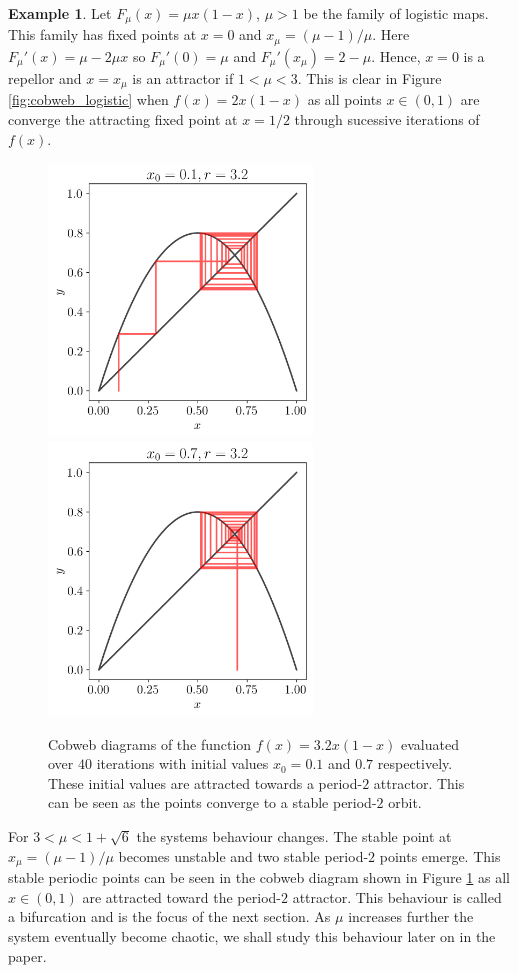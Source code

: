 \documentclass[11pt,a4paper,oneside]{memoir}
\theoremstyle{plain}
\theoremstyle{definition}
\newtheorem{exmp}[thm]{Example}
\begin{document}
\begin{exmp}
    Let $F_{\mu} (x) = \mu x(1 - x)$, $\mu > 1$ be the family of logistic maps. This family has fixed points at $x = 0$ and $x_\mu = (\mu - 1) / \mu$. Here $F_\mu'(x) = \mu - 2\mu x$ so $F_\mu'(0) = \mu$ and $F_\mu'(x_\mu) = 2 - \mu$. Hence, $x = 0$ is a repellor and $x = x_\mu$ is an attractor if $1 < \mu < 3$. This is clear in Figure \ref{fig:cobweb_logistic} when $f(x) = 2x(1-x)$ as all points $x \in (0, 1)$ are converge the attracting fixed point at $x = 1/2$ through sucessive iterations of $f(x)$.

    \begin{figure}[h]
        \centering
        \includegraphics[width=7cm]{cobweb_0.1_3.2}
        \includegraphics[width=7cm]{cobweb_0.7_3.2}
        \caption{Cobweb diagrams of the function $f(x) = 3.2x(1-x)$ evaluated over $40$ iterations with initial values $x_0 = 0.1$ and $0.7$ respectively. These initial values are attracted towards a period-$2$ attractor. This can be seen as the points converge to a stable period-$2$ orbit.}
        \label{fig:cobweb_3.2}
    \end{figure}
    
    For $3 < \mu < 1 + \sqrt{6}$ the systems behaviour changes. The stable point at $x_\mu = (\mu - 1) / \mu$ becomes unstable and two stable period-$2$ points emerge. This stable periodic points can be seen in the cobweb diagram shown in Figure \ref{fig:cobweb_3.2} as all $x \in (0, 1)$ are attracted toward the period-$2$ attractor. This behaviour is called a bifurcation and is the focus of the next section. As $\mu$ increases further the system eventually become chaotic, we shall study this behaviour later on in the paper.
\end{exmp}
\end{document}
